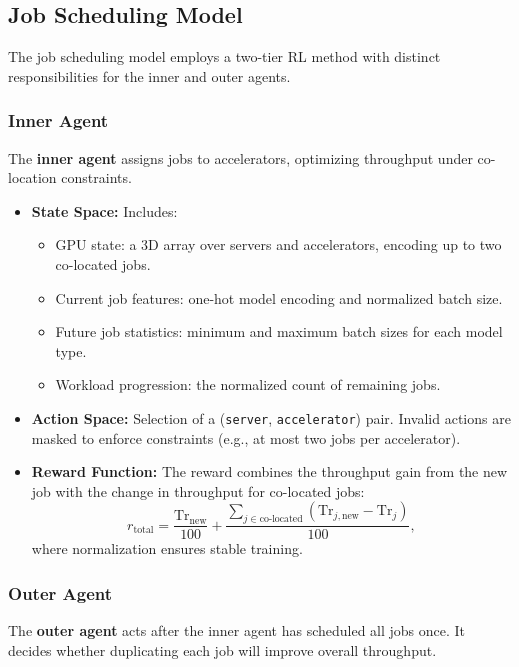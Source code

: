 \documentclass{article}
\begin{document}
\subsection{Job Scheduling Model}
\label{sec:model}

The job scheduling model employs a two-tier RL method with distinct responsibilities for the inner and outer agents.

\subsubsection{Inner Agent}
The \textbf{inner agent} assigns jobs to accelerators, optimizing throughput under co-location constraints.

\begin{itemize}
    \item \textbf{State Space:} Includes:
    \begin{itemize}
        \item GPU state: a 3D array over servers and accelerators, encoding up to two co-located jobs.
        \item Current job features: one-hot model encoding and normalized batch size.
        \item Future job statistics: minimum and maximum batch sizes for each model type.
        \item Workload progression: the normalized count of remaining jobs.
    \end{itemize}
    \item \textbf{Action Space:} Selection of a (\texttt{server}, \texttt{accelerator}) pair. Invalid actions are masked to enforce constraints (e.g., at most two jobs per accelerator).
    \item \textbf{Reward Function:} The reward combines the throughput gain from the new job with the change in throughput for co-located jobs:
    \begin{equation}
        r_{\text{total}} = \frac{\text{Tr}_{\text{new}}}{100} 
        + \frac{\sum_{j \in \text{co-located}} (\text{Tr}_{j,\text{new}} - \text{Tr}_{j})}{100},
    \end{equation}
    where normalization ensures stable training.
\end{itemize}

\subsubsection{Outer Agent}
The \textbf{outer agent} acts after the inner agent has scheduled all jobs once. It decides whether duplicating each job will improve overall throughput.
\end{document}

